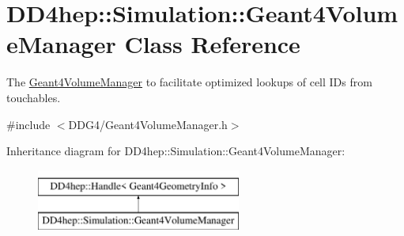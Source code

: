 \hypertarget{class_d_d4hep_1_1_simulation_1_1_geant4_volume_manager}{}\section{D\+D4hep\+:\+:Simulation\+:\+:Geant4\+Volume\+Manager Class Reference}
\label{class_d_d4hep_1_1_simulation_1_1_geant4_volume_manager}


The \hyperlink{class_d_d4hep_1_1_simulation_1_1_geant4_volume_manager}{Geant4\+Volume\+Manager} to facilitate optimized lookups of cell I\+Ds from touchables.  




{\ttfamily \#include $<$D\+D\+G4/\+Geant4\+Volume\+Manager.\+h$>$}

Inheritance diagram for D\+D4hep\+:\+:Simulation\+:\+:Geant4\+Volume\+Manager\+:\begin{figure}[H]
\begin{center}
\leavevmode
\includegraphics[height=2.000000cm]{class_d_d4hep_1_1_simulation_1_1_geant4_volume_manager}
\end{center}
\end{figure}
